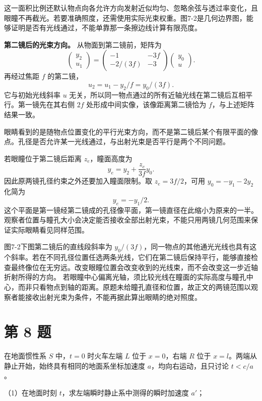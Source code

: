 \documentclass[12pt,a4paper,UTF8]{ctexart}
\begin{document}
这一面积比例还默认物点向各允许方向发射近似均匀、忽略余弦与透过率变化，且眼瞳不再截光。若要准确照度，还需使用实际光束权重。图7-2是几何边界图，能够证明是否有光线通过，不能单靠那一条擦边线计算有限亮度。

\textbf{第二镜后的光束方向。} 从物面到第二镜前，矩阵为 \[
\begin{pmatrix}y_2\\u_1\end{pmatrix}
=\begin{pmatrix}-1&-3f\\-2/(3f)&-3\end{pmatrix}
\begin{pmatrix}y_0\\u\end{pmatrix}.
\] 再经过焦距 \(f\) 的第二镜， \[
u_2=u_1-y_2/f=y_0/(3f).
\] 它与初始光线斜率 \(u\)
无关，所以同一物点通过的所有近轴光线在第二镜后互相平行。第一镜先在其右侧
\(2f\) 处形成中间实像，该像距离第二镜恰为 \(f\)，与上述矩阵结果一致。

眼睛看到的是随物点位置变化的平行光束方向，而不是第二镜后某个有限平面的像点。孔径是否允许某一光线通过，与出射光束是否平行是两个不同问题。

若眼瞳位于第二镜后距离 \(z_e\)，瞳面高度为 \[
y_e=y_2+\frac{z_e}{3f}y_0.
\] 因此原两镜孔径约束之外还要加入瞳面限制。取 \(z_e=3f/2\)，可用
\(y_0=-y_1-2y_2\) 化简为 \[
y_e=-y_1/2.
\]
这个平面是第一镜经第二镜成的孔径像平面，第一镜直径在此缩小为原来的一半。观察者位置与瞳孔大小会决定能否接收全部出射光束，不能只用两镜几何范围来保证实际眼睛看见同样范围。

图7-2下图第二镜后的直线段斜率为
\(y_0/(3f)\)，同一物点的其他通光光线也具有这个斜率。若在不同孔径位置任选两条光线，它们在第二镜后保持平行，能够直接检查最终像位在无穷远。改变眼瞳位置会改变收到的光线束，而不会改变这一步近轴折射所得的方向。
若眼瞳中心偏离光轴，须比较光线在瞳面的实际高度与瞳孔中心，而非只看物点到轴的距离。原题未给瞳孔直径和位置，故正文的两镜范围以观察者能接收出射光束为条件，不能再据此算出眼睛的绝对照度。

\newpage

\section{第 8 题}\label{ux7b2c-8-ux9898}

在地面惯性系 \(S\) 中，\(t=0\) 时火车左端 \(L\) 位于 \(x=0\)，右端 \(R\)
位于 \(x=l\)。两端从静止开始，始终具有相同的地面系坐标加速度
\(a\)，均向右运动，且只讨论 \(t<c/a\)。

（1）在地面时刻 \(t\)，求左端瞬时静止系中测得的瞬时加速度 \(a'\)；
\end{document}
